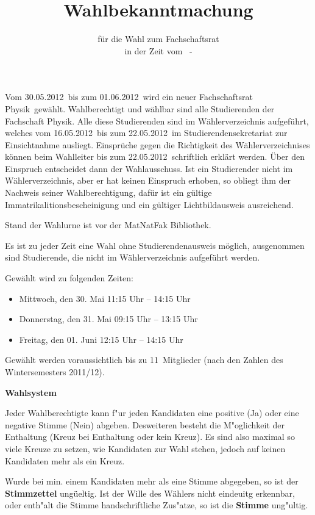 \documentclass[a4paper,10pt]{scrartcl}
\title{Wahlbekanntmachung}
\subtitle{für die Wahl zum Fachschaftsrat \fach \\ in der Zeit vom \wahlanfang ~- \wahlende}
\date{}
\def\fach{Physik}
\def\einsichtStart{16.05.2012}
\def\einsichtEnde{22.05.2012}
\def\wahlanfang{30.05.2012}
\def\wahlende{01.06.2012}
\def\ort{ist vor der MatNatFak Bibliothek}
\def\maxWahl{11}
\begin{document}
\pagestyle{empty}
\thispagestyle{empty}
\renewcommand{\titlepagestyle}{empty}
\vspace{-0.5cm}
\maketitle
\vspace{-5\baselineskip}
Vom \wahlanfang ~bis zum \wahlende ~wird ein neuer Fachschaftsrat \fach ~gewählt. Wahlberechtigt und wählbar sind alle Studierenden der Fachschaft \fach.
Alle diese Studierenden sind im Wählerverzeichnis aufgeführt, welches vom \einsichtStart ~bis zum \einsichtEnde ~im Studierendensekretariat zur Einsichtnahme ausliegt. Einsprüche gegen die Richtigkeit des Wählerverzeichnises können beim Wahlleiter bis zum \einsichtEnde ~schriftlich erklärt werden. Über den Einspruch entscheidet dann der Wahlausschuss. Ist ein Studierender nicht im Wählerverzeichnis, aber er hat keinen Einspruch erhoben, so obliegt ihm der Nachweis seiner Wahlberechtigung, dafür ist ein gültige Immatrikalitionsbescheinigung und ein gültiger Lichtbildausweis ausreichend.

Stand der Wahlurne \ort.

Es ist zu jeder Zeit eine Wahl ohne Studierendenausweis möglich, ausgenommen sind Studierende, die nicht im Wählerverzeichnis aufgeführt werden.

Gewählt wird zu folgenden Zeiten:
\begin{itemize}
\item Mittwoch, den 30. Mai 11:15 Uhr – 14:15 Uhr
\item Donnerstag, den 31. Mai 09:15 Uhr – 13:15 Uhr
\item Freitag, den 01. Juni 12:15 Uhr – 14:15 Uhr 

\end{itemize}

Gewählt werden voraussichtlich bis zu \maxWahl ~Mitglieder (nach den Zahlen des Wintersemesters 2011/12).

\textbf{Wahlsystem}

Jeder Wahlberechtigte kann f"ur jeden Kandidaten eine positive (Ja) oder eine negative Stimme (Nein) abgeben. Desweiteren besteht die M"oglichkeit der Enthaltung (Kreuz bei Enthaltung oder kein Kreuz). Es sind also maximal so viele Kreuze zu setzen, wie Kandidaten zur Wahl stehen, jedoch auf keinen Kandidaten mehr als ein Kreuz.

Wurde bei min. einem Kandidaten mehr als eine Stimme abgegeben, so ist der \textbf{Stimmzettel} ung\"ueltig. Ist der Wille des W\"ahlers nicht eindeuitg erkennbar, oder enth"alt die Stimme handschriftliche Zus"atze, so ist die \textbf{Stimme} ung"ultig.
\end{document}
